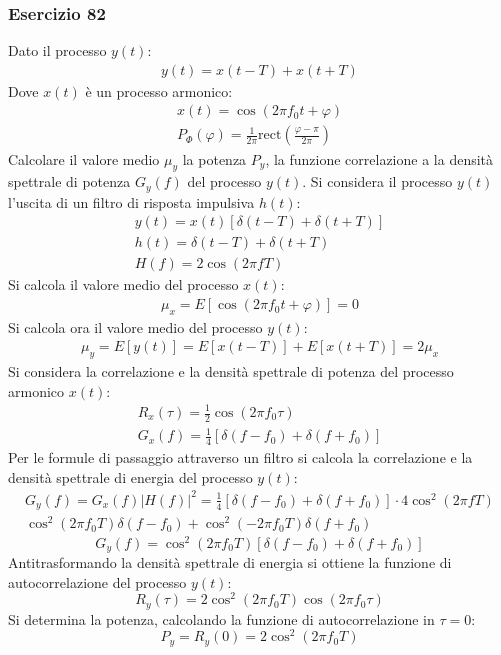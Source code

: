 \documentclass{article}
\newcommand{\rect}{\mathrm{rect}}
\begin{document}
\subsubsection*{Esercizio 82}

Dato il processo $y(t)$:
\begin{gather*}
    y(t)=x(t-T)+x(t+T)
\end{gather*}
Dove $x(t)$ è un processo armonico:
\begin{gather*}
    x(t)=\displaystyle\cos\left(2\pi f_0t+\varphi\right)\\
    P_{\Phi}(\varphi)=\displaystyle\frac{1}{2\pi}\rect\left(\frac{\varphi-\pi}{2\pi}\right)
\end{gather*}
Calcolare il valore medio $\mu_y$ la potenza $P_y$, la funzione correlazione a la densità spettrale di potenza $G_y(f)$ del processo $y(t)$. 
Si considera il processo $y(t)$ l'uscita di un filtro di risposta impulsiva $h(t)$:
\begin{gather*}
    y(t)=x(t)[\delta(t-T)+\delta(t+T)]\\
    h(t)=\delta(t-T)+\delta(t+T)\\
    H(f)=2\cos\left(2\pi fT\right)
\end{gather*}
Si calcola il valore medio del processo $x(t)$:
\begin{gather*}
    \mu_x=E[\cos(2\pi f_0t+\varphi)]=0
\end{gather*}
Si calcola ora il valore medio del processo $y(t)$:
\begin{gather}
    \mu_y=E[y(t)]=E[x(t-T)]+E[x(t+T)]=2\mu_x
\end{gather}
Si considera la correlazione e la densità spettrale di potenza del processo armonico $x(t)$:
\begin{gather*}
    R_x(\tau)=\displaystyle\frac{1}{2}\cos(2\pi f_0\tau)\\
    G_x(f)=\displaystyle\frac{1}{4}\left[\delta(f-f_0)+\delta(f+f_0)\right]
\end{gather*}
Per le formule di passaggio attraverso un filtro si calcola la correlazione e la densità spettrale di energia del processo $y(t)$:
\begin{gather*}
    G_y(f)=G_x(f)|H(f)|^2=\displaystyle\frac{1}{4}\left[\delta(f-f_0)+\delta(f+f_0)\right]\cdot4\cos^2(2\pi fT)\\
    \cos^2(2\pi f_0T)\delta(f-f_0)+\cos^2(-2\pi f_0T)\delta(f+f_0)
\end{gather*}
\begin{equation}
    G_y(f)=\cos^2(2\pi f_0T)[\delta(f-f_0)+\delta(f+f_0)]
\end{equation}
Antitrasformando la densità spettrale di energia si ottiene la funzione di autocorrelazione del processo $y(t)$:
\begin{equation}
    R_y(\tau)=2\cos^2(2\pi f_0T)\cos(2\pi f_0\tau)
\end{equation}
Si determina la potenza, calcolando la funzione di autocorrelazione in $\tau=0$:
\begin{equation}
    P_y=R_y(0)=2\cos^2(2\pi f_0T)
\end{equation}

\clearpage
\end{document}
